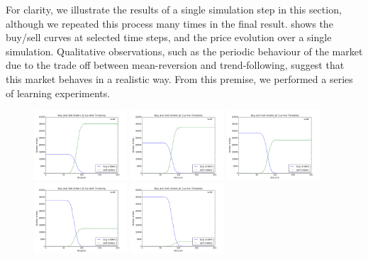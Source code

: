 \documentclass[11pt]{article}
\begin{document}
For clarity, we illustrate the results of a single simulation step in this section, although we repeated this process many times in the final result.  shows the buy/sell curves at selected time steps, and the price evolution over a single simulation. Qualitative observations, such as the periodic behaviour of the market due to the trade off between mean-reversion and trend-following, suggest that this market behaves in a realistic way. From this premise, we performed a series of learning experiments.
\begin{figure}
  \centering
  \quad
  \includegraphics[width=0.31\textwidth]{figures/buy_sell_0046.png}
  \includegraphics[width=0.31\textwidth]{figures/buy_sell_0047.png}
  \includegraphics[width=0.31\textwidth]{figures/buy_sell_0048.png}
  \includegraphics[width=0.31\textwidth]{figures/buy_sell_0049.png}
  \includegraphics[width=0.31\textwidth]{figures/buy_sell_0050.png}

\end{figure}
\end{document}
